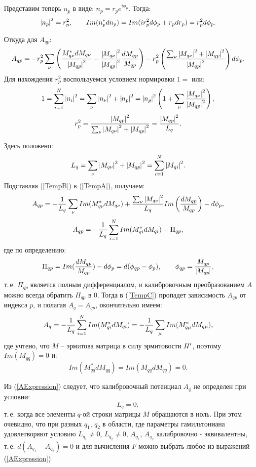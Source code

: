 \documentclass[a4paper,titlepage]{article}
\newcommand{\MathBr}[1]{\ifmmode{#1} \else{$#1$} \fi}
\newcommand{\Ht}{\MathBr{H'}}
\newcommand{\DirProd}[2]{\MathBr{<\!\!#1|#2\!\!>}}
\newcommand{\mod}[1]{\MathBr{\mid\!\!#1\!\!\mid}}
\newcommand{\rf}[1]{(\ref{#1})}
\begin{document}
Представим теперь $n_p$ в виде: $n_p = r_pe^{i\phi_p}$. Тогда:
\[
   \mod{n_p}^2 = r_p^2, \qquad
   Im(n^\ast_p dn_p) = Im( ir_p^2d\phi_p + r_p dr_p) = r_p^2d\phi_p.
\]

Откуда для $A_{qp}$:
\begin{equation}
  A_{qp} = -r_p^2 \sum_{\nu}
   \left({M^\ast_{q\nu} dM_{q\nu} \over \mod{M_{qp}}^2}
     - {\mod{M_{q\nu}}^2 \over \mod{M_{qp}}^2} {dM_{qp} \over M_{qp}}\right)
   - r_p^2\left({\sum_{\nu} \mod{M_{q\nu}}^2 + \mod{M_{qp}}^2
       \over \mod{M_{qp}}^2}\right) d\phi_p.
\label{TempA}
\end{equation}
  Для нахождения $r_p^2$ воспользуемся условием
нормировки $1 = $\DirProd{n}{n} или:
\[
  1 = \sum_{i = 1}^{N} \mod{n_i}^2 = \sum_{\nu} \mod{n_\nu}^2 + \mod{n_p}^2 =
   \mod{n_p}^2\left(
      1 + \sum_{\nu} {\mod{M_{q\nu}}^2 \over \mod{M_{qp}}^2}\right),
\]
\begin{equation}
   r_p^2 =
     {\mod{M_{qp}}^2 \over \sum_{\nu} \mod{M_{q\nu}}^2 + \mod{M_{qp}}^2}
     = {\mod{M_{qp}}^2 \over L_q}.
\label{TempB}
\end{equation}

Здесь положено:
\[
  L_q = \sum_{\nu} \mod{M_{q\nu}}^2 + \mod{M_{qp}}^2
    = \sum_{i = 1}^N \mod{M_{qi}}^2.
\]
   Подставляя \rf{TempB} в \rf{TempA}, получаем:
\[
  A_{qp} = - {1 \over L_q}\sum_{\nu} Im(M^\ast_{q\nu} dM_{q\nu})
    + {\sum_{\nu} \mod{M_{q\nu}}^2 \over L_q}
      Im\left({dM_{qp} \over M_{qp}}\right) - d\phi_p,
\]
\begin{equation}
  A_{qp} = - {1 \over L_q}\sum_{i = 1}^{N} Im(M^\ast_{qi} dM_{qi})
    + \Pi_{qp},
\label{TempC}
\end{equation}
где по определению:
\[
   \Pi_{qp} = Im({dM_{qp} \over M_{qp}}) - d\phi_p = d(\phi_{qp} - \phi_p),
   \qquad  \phi_{qp} = {M_{qp} \over \mod{M_{qp}}},
\]
т.\,е. $\Pi_{qp}$ является полным дифференциалом, и калибровочным
преобразованием $A$ можно всегда обратить $\Pi_{qp}$ в 0. Тогда в
\rf{TempC} пропадет зависимость $A_{qp}$ от индекса $p$, и полагая
$A_q = A_{qp}$, окончательно имеем:
\begin{equation}
   A_q = - {1 \over L_q}\sum_{i = 1}^{N} Im(M^\ast_{qi} dM_{qi})
      = - {1 \over L_q}\sum_{\mu} Im(M^\ast_{q\mu} dM_{q\mu}),
\label{AExpression}
\end{equation}
где учтено, что $M$ -- эрмитова матрица в силу эрмитовости $\Ht$,
поэтому $Im(M_{qq}) = 0$ и:
\[
   Im(M^\ast_{qq}dM_{qq}) = Im(M_{qq}dM_{qq}) = 0.
\]

Из \rf{AExpression} следует, что калибровочный потенциал $A_q$
не определен при условии:
\begin{equation}
  L_q = 0,
\label{UndefinedA}
\end{equation}
т.\,е. когда все элементы $q$-ой строки матрицы $M$ обращаются в ноль.
При этом очевидно, что при разных $q_1$, $q_2$ в области, где параметры
гамильтониана удовлетворяют условию $L_{q_1} \ne 0$, $L_{q_2} \ne 0$,
$A_{q_1}$, $A_{q_2}$ калибровочно - эквивалентны, т.\,е.
$d(A_{q_1} - A_{q_2}) = 0$ и для вычисления $F$ можно выбрать любое из
выражений \rf{AExpression}
\end{document}
